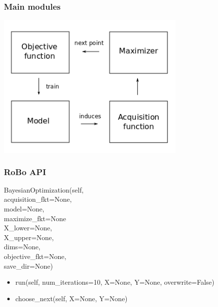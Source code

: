 \documentclass[10pt,handout]{beamer}
\begin{document}
\begin{frame}
\frametitle{Main modules}

\begin{center}
\includegraphics[width=0.7\textwidth]{robo_framework.png}
\end{center}


\end{frame}
\begin{frame}

\frametitle{RoBo API}
BayesianOptimization(self, \\
\hspace{1cm} acquisition\_fkt=None, \\
\hspace{1cm} model=None, \\
\hspace{1cm} maximize\_fkt=None \\
\hspace{1cm} X\_lower=None, \\
\hspace{1cm} X\_upper=None, \\
\hspace{1cm} dims=None, \\
\hspace{1cm} objective\_fkt=None, \\
\hspace{1cm} save\_dir=None)
\begin{itemize}
\item run(self, num\_iterations=10, X=None, Y=None, overwrite=False)
\item choose\_next(self, X=None, Y=None)
\end{itemize}


\end{frame}
\end{document}
